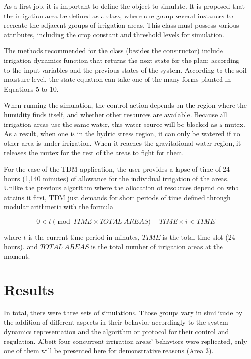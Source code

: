 \documentclass[12pt]{article}
\begin{document}
As a first job, it is important to define the object to simulate. It is proposed that the irrigation area be defined as a class, where one group several instances to recreate the adjacent groups of irrigation areas. This class must possess various attributes, including the crop constant and threshold levels for simulation.

The methods recommended for the class (besides the constructor) include irrigation dynamics function that returns the next state for the plant according to the input variables and the previous states of the system. According to the soil moisture level, the state equation can take one of the many forms planted in Equations 5 to 10.

When running the simulation, the control action depends on the region where the humidity finds itself, and whether other resources are available. Because all irrigation areas use the same water, this water source will be blocked as a mutex. As a result, when one is in the hydric stress region, it can only be watered if no other area is under irrigation. When it reaches the gravitational water region, it releases the mutex for the rest of the areas to fight for them.

For the case of the TDM application, the user provides a lapse of time of 24 hours (1,140 minutes) of allowance for the individual irrigation of the areas. Unlike the previous algorithm where the allocation of resources depend on who attains it first, TDM just demands for short periods of time defined through modular arithmetic with the formula

\begin{equation}
\label{eqn:11}
0 < t \pmod{TIME \times TOTAL\:AREAS} - TIME \times i < TIME
\end{equation}

where $t$ is the current time period in minutes, $TIME$ is the total time slot (24 hours), and $TOTAL\:AREAS$ is the total number of irrigation areas at the moment.

\section{Results}

In total, there were three sets of simulations. Those groups vary in similitude by the addition of different aspects in their behavior accordingly to the system dynamics representation and the algorithm or protocol for their control and regulation. Albeit four concurrent irrigation areas' behaviors were replicated, only one of them will be presented here for demonstrative reasons (Area 3).
\end{document}
